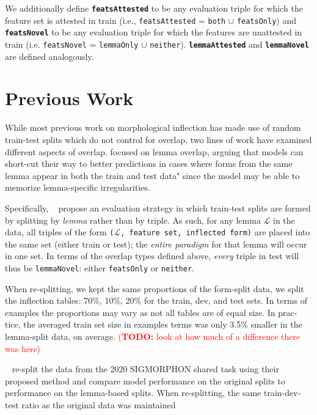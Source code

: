 \documentclass[11pt]{article}
\newcommand{\todo}[1]{\textcolor{red}{(\textbf{TODO:} #1)}}
\newcommand{\goldmana}{\citeauthor{goldman-etal-2022-un}}
\begin{document}
We additionally define \textbf{\texttt{featsAttested}} to be any evaluation triple for which the feature set is attested in train (i.e., \texttt{featsAttested} = \texttt{both} $\cup$ \texttt{featsOnly}) and \textbf{\texttt{featsNovel}} to be any evaluation triple for which the features are unattested in train (i.e. \texttt{featsNovel} = \texttt{lemmaOnly} $\cup$ \texttt{neither}). 
\textbf{\texttt{lemmaAttested}} and \textbf{\texttt{lemmaNovel}} are defined analogously. 



\section{Previous Work}

While most previous work on morphological inflection has made use of random train-test splits which do not control for overlap, two lines of work have examined different aspects of overlap. 
\citet[864]{goldman-etal-2022-un} focused on lemma overlap, arguing that models can short-cut their way to better predictions in cases where forms from the same lemma appear in both the train and test data" since the model may  be able to memorize lemma-specific irregularities.

Specifically, \goldmana~ propose an evaluation strategy in which train-test splits are formed by splitting by \textit{lemma} rather than by triple. 
As such, for any  lemma $\mathcal{L}$ in the data, all triples of the form \texttt{($\mathcal{L}$, feature set, inflected form)} are placed into the same set (either train or test); the \textit{entire paradigm} for that lemma will occur in one set. 
In terms of the overlap types defined above, \textit{every} triple in test will thus be \texttt{lemmaNovel}: either \texttt{featsOnly} or \texttt{neither}. 


When re-splitting, we kept the same proportions of the form-split data, we split the inflection tables: 70\%, 10\%, 20\% for the train, dev, and test sets. 
In terms of examples the proportions may vary as not all tables are of equal size. In prac- tice, the averaged train set size in examples terms was only 3.5\% smaller in the lemma-split data, on average.
\todo{look at how much of a difference there was here}


\goldmana~ re-split the data from the 2020 SIGMORPHON shared task using their proposed method and compare model performance  on the original splits to performance on the lemma-based splits. 
When re-splitting, the same train-dev-test ratio as the original data was maintained 
\end{document}
